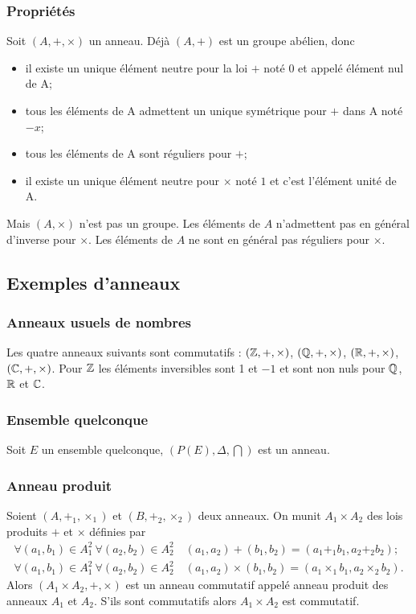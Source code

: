\subsubsection{Propriétés}

Soit \((A,+,\times)\) un anneau. Déjà \((A,+)\) est un groupe abélien, donc
\begin{itemize}
\item il existe un unique élément neutre pour la loi \(+\) noté \(0\) et appelé élément nul de A;
\item tous les éléments de A admettent un unique symétrique pour \(+\) dans A noté \(-x\);
\item tous les éléments de A sont réguliers pour \(+\);
\item il existe un unique élément neutre pour \(\times\) noté \(1\) et c'est l'élément unité de A.
\end{itemize}

Mais \((A,\times)\) n'est pas un groupe. Les éléments de \(A\) n'admettent pas en général d'inverse pour \(\times\). Les éléments de \(A\) ne sont en général pas réguliers pour \(\times\).

\subsection{Exemples d'anneaux}

\subsubsection{Anneaux usuels de nombres}

Les quatre anneaux suivants sont commutatifs : \((\mathbb{Z},+,\times)\), \((\mathbb{Q},+,\times)\), \((\mathbb{R},+,\times)\), \((\mathbb{C},+,\times)\). Pour \(\mathbb{Z}\) les éléments inversibles sont 1 et \(-1\) et sont non nuls pour \(\mathbb{Q}\), \(\mathbb{R}\) et \(\mathbb{C}\).

\subsubsection{Ensemble quelconque}

Soit \(E\) un ensemble quelconque, \((P(E), \Delta, \bigcap)\) est un anneau.

\subsubsection{Anneau produit}

Soient \((A,+_1,\times_1)\) et \((B,+_2,\times_2)\) deux anneaux. On munit \(A_1 \times A_2\) des lois produits \(+\) et \(\times\) définies par
\begin{align}
  \forall (a_1,b_1) \in A_1^2 \ \forall (a_2,b_2) \in A_2^2 \quad (a_1,a_2)+(b_1,b_2) = (a_1 +_1 b_1, a_2 +_2 b_2);\\
  \forall (a_1,b_1) \in A_1^2 \ \forall (a_2,b_2) \in A_2^2 \quad (a_1,a_2) \times (b_1,b_2) = (a_1 \times_1 b_1, a_2 \times_2 b_2).
\end{align}
Alors \((A_1 \times A_2, +, \times)\) est un anneau commutatif appelé anneau produit des anneaux \(A_1\) et \(A_2\). S'ils sont commutatifs alors \(A_1 \times A_2\) est commutatif.

